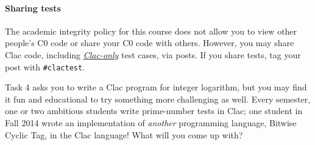 \documentclass[12pt]{exam}
\begin{document}



\paragraph{Sharing tests}

The academic integrity policy for this course does not allow you to
view other people's C0 code or share your C0 code with
others. However, you may share Clac code, including \underline{\em
  Clac-only} test cases, via \qatool{} posts. If you share tests, tag
your post with \lstinline'#clactest'.

\clearpage
Task 4 asks you to write a Clac program for integer logarithm, but you
may find it fun and educational to try something more challenging as
well.  Every semester, one or two ambitious students write prime-number
tests in Clac; one student in Fall 2014 wrote an implementation of
\emph{another} programming language, Bitwise Cyclic Tag, in the Clac
language! What will you come up with?
\end{document}
